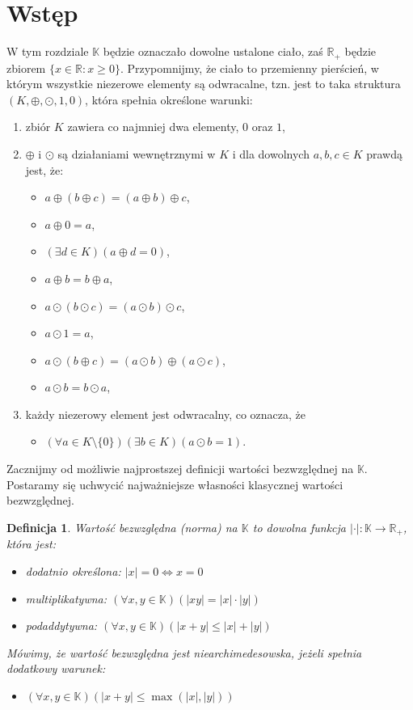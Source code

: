 \documentclass[a4paper,fleqn,9pt]{extarticle}
\newtheorem{dff}{Definicja}
\newenvironment{enumx}{\begin{enumerate}
	\setlength{\itemsep}{0pt}
	\setlength{\parskip}{0pt}
	\setlength{\parsep}{0pt}}
{\end{enumerate}}
\newenvironment{itemx}{\begin{itemize}
	\setlength{\itemsep}{0pt}
	\setlength{\parskip}{0pt}
	\setlength{\parsep}{0pt}}
{\end{itemize}}
\begin{document}
\section{Wstęp}

%



W tym rozdziale $\mathbb K$ będzie oznaczało dowolne ustalone ciało, zaś $\mathbb R_+$ będzie zbiorem $\{x\in\mathbb R:x\ge 0\}$.
Przypomnijmy, że ciało to przemienny pierścień, w którym wszystkie niezerowe elementy są odwracalne, tzn. jest to taka struktura $(K,\oplus, \odot,1,0)$, która spełnia określone warunki:
\begin{enumx}
\item zbiór $K$ zawiera co najmniej dwa elementy, $0$ oraz $1$,
\item $\oplus$ i $\odot$ są działaniami wewnętrznymi w $K$ i dla dowolnych $a,b,c\in K$ prawdą jest, że:
\begin{itemx}
\item $a \oplus (b \oplus c) = (a \oplus b) \oplus c$,
\item $a \oplus 0 = a$,
\item $(\exists d \in K)(a \oplus d = 0)$,
\item $a \oplus b = b \oplus a$,
\item $a \odot (b \odot c) = (a \odot b) \odot c$,
\item $a \odot 1 = a$,
\item $a \odot (b \oplus c)= (a \odot b) \oplus (a \odot c)$,
\item $a \odot b = b \odot a$,
\end{itemx}
\item każdy niezerowy element jest odwracalny, co oznacza, że
\begin{itemx}
\item $(\forall a \in K \setminus \{0\})(\exists b \in K)(a \odot b = 1)$.
\end{itemx}
\end{enumx}

Zacznijmy od możliwie najprostszej definicji wartości bezwzględnej na $\mathbb K$.
Postaramy się uchwycić najważniejsze własności klasycznej wartości bezwzględnej.

\begin{dff}
Wartość bezwzględna (norma) na $\mathbb K$ to dowolna funkcja $|\cdot| : \mathbb K \rightarrow \mathbb R_+$, która jest:
\begin{itemx}
\item dodatnio określona: $|x| = 0 \iff x = 0$ 
\item multiplikatywna: $(\forall x, y\in\mathbb K)(|xy|=|x|\cdot|y|)$
\item podaddytywna: $(\forall x, y\in\mathbb K)(|x+y|\le|x|+|y|)$
\end{itemx}
Mówimy, że wartość bezwzględna jest niearchimedesowska, jeżeli spełnia dodatkowy warunek:
\begin{itemx}
\item $(\forall x,y\in\mathbb K)(|x+y| \le \max(|x|,|y|))$ 
\end{itemx}
\end{dff}
\end{document}

